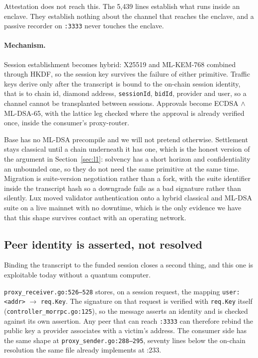 \documentclass[11pt,a4paper]{article}
\newcommand{\code}[1]{\texttt{\small #1}}
\begin{document}
Attestation does not reach this. The 5{,}439 lines establish what runs inside an
enclave. They establish nothing about the channel that reaches the enclave, and
a passive recorder on \code{:3333} never touches the enclave.

\paragraph{Mechanism.} Session establishment becomes hybrid: X25519 and
ML-KEM-768 combined through HKDF, so the session key survives the failure of
either primitive. Traffic keys derive only after the transcript is bound to the
on-chain session identity, that is to chain id, diamond address,
\code{sessionId}, \code{bidId}, provider and user, so a channel cannot be
transplanted between sessions. Approvals become ECDSA $\wedge$ ML-DSA-65, with
the lattice leg checked where the approval is already verified once, inside the
consumer's proxy-router.

Base has no ML-DSA precompile and we will not pretend otherwise. Settlement
stays classical until a chain underneath it has one, which is the honest version
of the argument in Section~\ref{sec:l1}: solvency has a short horizon and
confidentiality an unbounded one, so they do not need the same primitive at the
same time. Migration is suite-version negotiation rather than a fork, with the
suite identifier inside the transcript hash so a downgrade fails as a bad
signature rather than silently. Lux moved validator authentication onto a hybrid
classical and ML-DSA suite on a live mainnet with no downtime, which is the only
evidence we have that this shape survives contact with an operating network.

\subsection{Peer identity is asserted, not resolved}
\label{sec:rebind}

Binding the transcript to the funded session closes a second thing, and this one
is exploitable today without a quantum computer.

\code{proxy\_receiver.go:526--528} stores, on a session request, the mapping
\code{user:<addr>} $\rightarrow$ \code{req.Key}. The signature on that request is
verified with \code{req.Key} itself
(\code{controller\_morrpc.go:125}), so the message asserts an identity and is
checked against its own assertion. Any peer that can reach \code{:3333} can
therefore rebind the public key a provider associates with a victim's address.
The consumer side has the same shape at \code{proxy\_sender.go:288--295},
seventy lines below the on-chain resolution the same file already implements at
:233.
\end{document}

